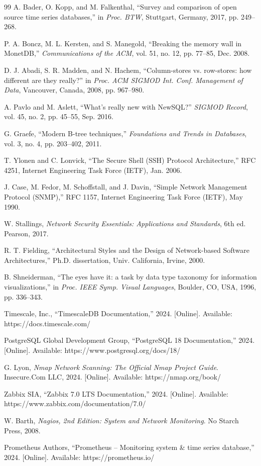 \documentclass{ieeeaccess}
\begin{document}
\begin{thebibliography}{99}
A. Bader, O. Kopp, and M. Falkenthal, ``Survey and comparison of open source time series databases,'' in \textit{Proc. BTW}, Stuttgart, Germany, 2017, pp. 249--268.

P. A. Boncz, M. L. Kersten, and S. Manegold, ``Breaking the memory wall in MonetDB,'' \textit{Communications of the ACM}, vol. 51, no. 12, pp. 77--85, Dec. 2008.

D. J. Abadi, S. R. Madden, and N. Hachem, ``Column-stores vs. row-stores: how different are they really?'' in \textit{Proc. ACM SIGMOD Int. Conf. Management of Data}, Vancouver, Canada, 2008, pp. 967--980.

A. Pavlo and M. Aslett, ``What's really new with NewSQL?'' \textit{SIGMOD Record}, vol. 45, no. 2, pp. 45--55, Sep. 2016.

G. Graefe, ``Modern B-tree techniques,'' \textit{Foundations and Trends in Databases}, vol. 3, no. 4, pp. 203--402, 2011.

T. Ylonen and C. Lonvick, ``The Secure Shell (SSH) Protocol Architecture,'' RFC 4251, Internet Engineering Task Force (IETF), Jan. 2006.

J. Case, M. Fedor, M. Schoffstall, and J. Davin, ``Simple Network Management Protocol (SNMP),'' RFC 1157, Internet Engineering Task Force (IETF), May 1990.

W. Stallings, \textit{Network Security Essentials: Applications and Standards}, 6th ed. Pearson, 2017.

R. T. Fielding, ``Architectural Styles and the Design of Network-based Software Architectures,'' Ph.D. dissertation, Univ. California, Irvine, 2000.

B. Shneiderman, ``The eyes have it: a task by data type taxonomy for information visualizations,'' in \textit{Proc. IEEE Symp. Visual Languages}, Boulder, CO, USA, 1996, pp. 336--343.

Timescale, Inc., ``TimescaleDB Documentation,'' 2024. [Online]. Available: https://docs.timescale.com/

PostgreSQL Global Development Group, ``PostgreSQL 18 Documentation,'' 2024. [Online]. Available: https://www.postgresql.org/docs/18/

G. Lyon, \textit{Nmap Network Scanning: The Official Nmap Project Guide}. Insecure.Com LLC, 2024. [Online]. Available: https://nmap.org/book/

Zabbix SIA, ``Zabbix 7.0 LTS Documentation,'' 2024. [Online]. Available: https://www.zabbix.com/documentation/7.0/

W. Barth, \textit{Nagios, 2nd Edition: System and Network Monitoring}. No Starch Press, 2008.

Prometheus Authors, ``Prometheus -- Monitoring system \& time series database,'' 2024. [Online]. Available: https://prometheus.io/

\end{thebibliography}
\end{document}
